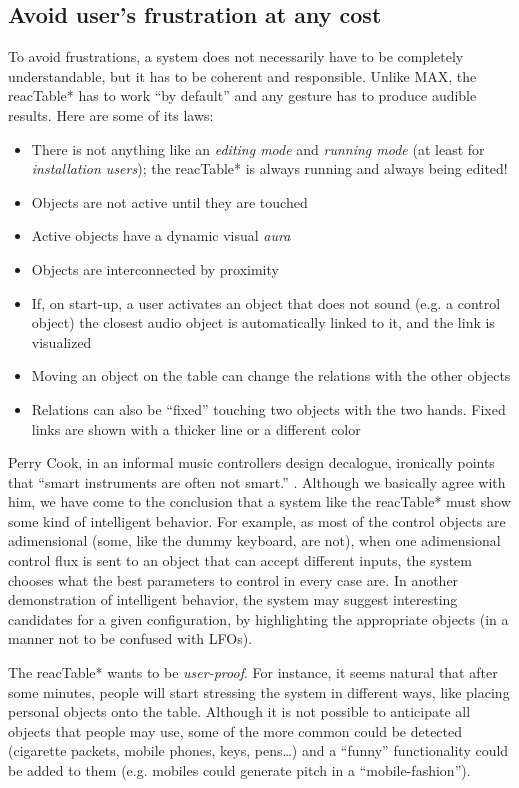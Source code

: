\subsection{Avoid user's frustration at any cost}
To avoid frustrations, a system does not necessarily have to be completely
understandable, but it has to be coherent and responsible. Unlike MAX, the
reacTable* has to work ``by default'' and any gesture has to produce audible
results.  Here are some of its laws:

\begin{itemize}
\item There is not anything like an \textit{editing  mode}
and  \textit{running mode} (at least for \textit{installation  users}); the  reacTable*  is always running and always being edited!
\item Objects are not active until they are touched
\item Active objects have a dynamic visual \textit{aura}
\item Objects are interconnected by proximity
\item If, on  start-up, a  user  activates an  object that  does not sound (e.g. a control  object)  the  closest  audio object is automatically linked to it, and the link is visualized
\item Moving an object on the  table  can change the  relations with the other objects
\item Relations can also be ``fixed'' touching two objects  with the two hands. Fixed links are shown with a thicker line or a different color
\end{itemize}

Perry Cook, in an informal music controllers design decalogue, ironically points
that ``smart instruments are often not smart.'' \cite{Cook:2001}. Although  we
basically  agree with  him, we have come to the conclusion that a system like the
reacTable* must show some kind of intelligent  behavior. For example, as most of
the control objects are adimensional (some, like the dummy keyboard, are not),
when  one  adimensional  control flux is sent to an object that can accept
different inputs, the system chooses what the best parameters to  control  in 
every case are. In another demonstration  of intelligent  behavior, the system
may suggest interesting candidates for a given configuration, by highlighting 
the appropriate objects (in a manner not to be confused with LFOs).

The reacTable*  wants to be  \textit{user-proof}. For  instance,  it seems  natural 
that  after  some  minutes,  people  will  start stressing the system in
different ways, like placing personal objects onto the table. Although it is not
possible  to anticipate all objects  that  people  may use, some of the  more
common could be detected (cigarette packets, mobile phones, keys, pens\ldots{})
and a ``funny'' functionality could be  added  to  them (e.g. mobiles could
generate pitch in a ``mobile-fashion'').

